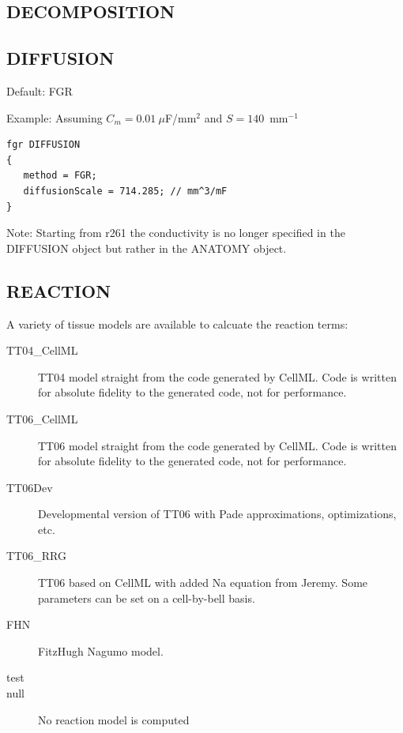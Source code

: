 \documentclass{article}
\begin{document}
\subsection{DECOMPOSITION}
\begin{keywords}
\end{keywords}

\subsection{DIFFUSION}

\begin{keywords}
  {Default: FGR}
\end{keywords}


Example:
Assuming $C_m = 0.01~\mu$F/mm$^2$ and $S=140$~mm$^{-1}$
\begin{verbatim}
fgr DIFFUSION
{
   method = FGR;
   diffusionScale = 714.285; // mm^3/mF
}
\end{verbatim}

Note: Starting from r261 the conductivity is no longer specified in the
DIFFUSION object but rather in the ANATOMY object.

\subsection{REACTION}
A variety of tissue models are available to calcuate the reaction terms:

\begin{description}
  \item[TT04\_CellML] TT04 model straight from the code generated by
    CellML.  Code is written for absolute fidelity to the generated
    code, not for performance.
  \item[TT06\_CellML] TT06 model straight from the code generated by
    CellML.  Code is written for absolute fidelity to the generated
    code, not for performance.
  \item[TT06Dev] Developmental version of TT06 with Pade approximations,
    optimizations, etc.
  \item[TT06\_RRG] TT06 based on CellML with added Na equation from
    Jeremy.  Some parameters can be set on a cell-by-bell basis.
  \item[FHN] FitzHugh Nagumo model.
  \item[test] 
  \item[null] No reaction model is computed
\end{description}
\end{document}
